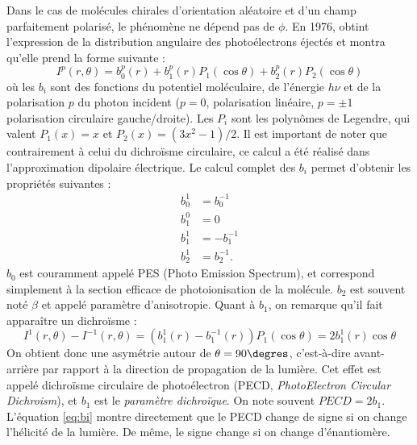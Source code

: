 Dans le cas de molécules chirales d'orientation aléatoire et d'un champ parfaitement polarisé, le phénomène ne dépend pas de $\phi$. En 1976,  obtint l'expression de la distribution angulaire des photoélectrons éjectés et montra qu'elle prend la forme suivante :
\begin{equation}
I^p(r,\theta) = b_0^p(r) + b_1^p(r) P_1(\cos\theta) + b_2^p(r) P_2(\cos\theta)
\label{eq:angulardistrib}
\end{equation}
où les $b_i$ sont des fonctions du potentiel moléculaire, de l'énergie $h\nu$ et de la polarisation $p$ du photon incident ($p = 0$, polarisation linéaire, $p =\pm1$ polarisation circulaire gauche/droite). Les $P_i$ sont les polynômes de Legendre, qui valent $P_1(x) = x$ et $P_2(x) = (3x^2-1)/2$. Il est important de noter que contrairement à celui du dichroïsme circulaire, ce calcul a été réalisé dans l'approximation dipolaire électrique. Le calcul complet des $b_i$ permet d'obtenir les propriétés suivantes :
\begin{align}
b_0^1 &= b_0^{-1} \nonumber\\
b_1^0 &= 0\nonumber\\
b_1^1 &= -b_1^{-1}\nonumber\\
b_2^1 &= b_2^{-1}.
\label{eq:bi}
\end{align}
$b_0$ est couramment appelé PES (Photo Emission Spectrum), et correspond simplement à la section efficace de photoionisation de la molécule. $b_2$ est souvent noté $\beta$ et appelé paramètre d'anisotropie. Quant à $b_1$, on remarque qu'il fait apparaître un dichroïsme :
\begin{equation}
I^{1}(r,\theta)-I^{-1}(r,\theta) = (b_1^1(r)-b_1^{-1}(r))P_1(\cos\theta) = 2b_1^1(r)\cos\theta
\label{eq:pecddef}
\end{equation}
On obtient donc une asymétrie autour de $\theta = 90\degres$, c'est-à-dire avant-arrière par rapport à la direction de propagation de la lumière. Cet effet est appelé dichroïsme circulaire de photoélectron (PECD, \textit{PhotoElectron Circular Dichroism}), et $b_1$ est le \textit{paramètre dichroïque}. On note souvent $PECD = 2b_1$. L'équation \ref{eq:bi} montre directement que le PECD change de signe si on change l'hélicité de la lumière. De même, le signe change si on change d'énantiomère.

